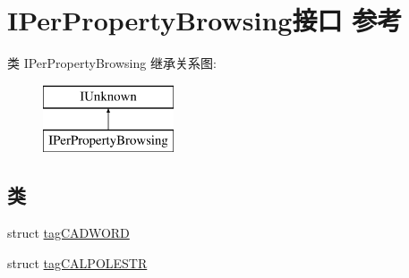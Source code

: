 \hypertarget{interface_i_per_property_browsing}{}\section{I\+Per\+Property\+Browsing接口 参考}
\label{interface_i_per_property_browsing}
类 I\+Per\+Property\+Browsing 继承关系图\+:\begin{figure}[H]
\begin{center}
\leavevmode
\includegraphics[height=2.000000cm]{interface_i_per_property_browsing}
\end{center}
\end{figure}
\subsection*{类}
\begin{DoxyCompactItemize}
\item 
struct \hyperlink{struct_i_per_property_browsing_1_1tag_c_a_d_w_o_r_d}{tag\+C\+A\+D\+W\+O\+RD}
\item 
struct \hyperlink{struct_i_per_property_browsing_1_1tag_c_a_l_p_o_l_e_s_t_r}{tag\+C\+A\+L\+P\+O\+L\+E\+S\+TR}
\end{DoxyCompactItemize}
